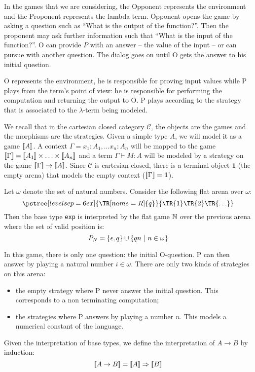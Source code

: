 In the games that we are considering, the Opponent represents the
environment and the Proponent represents the lambda term. Opponent
opens the game by asking a question such as ``What is the output of
the function?''. Then the proponent may ask further information
such that ``What is the input of the function?''. O can provide
$P$ with an answer -- the value of the input -- or can pursue with
another question. The dialog goes on until O gets the answer to his
initial question.

O represents the environment, he is responsible for proving input
values while P plays from the term's point of view: he is
responsible for performing the computation and returning the output
to O. P plays according to the strategy that is associated to the
$\lambda$-term being modeled.

We recall that in the cartesian closed category $\mathcal{C}$, the
objects are the games and the morphisms are the strategies. Given a
simple type $A$, we will model it as a game ${[\![ A ]\!]}$. A context
$\Gamma = x_1 :A_1, \ldots x_n:A_n$ will be mapped to the game
${[\![ \Gamma ]\!]} = {[\![ A_1 ]\!]} \times \ldots \times {[\![A_n ]\!]}$ and a term
$\Gamma \vdash M : A$ will be modeled by a strategy on the game
${[\![ \Gamma ]\!]} \rightarrow {[\![A ]\!]}$. Since $\mathcal{C}$ is cartesian
closed, there is a terminal object $\textbf{1}$ (the empty arena)
that models the empty context (${[\![ \Gamma ]\!]} = \textbf{1}$).


Let $\omega$ denote the set of natural numbers. Consider the
following flat arena over $\omega$:
$$  \pstree[levelsep=6ex]
    {\TR[name=R]{q}}
    { \TR{1} \TR{2} \TR{\ldots}
    }
$$
Then the base type \texttt{exp} is interpreted by the flat game
$\mathbb{N}$ over the previous arena where the set of valid position is:
$$P_N = \{ \epsilon, q \} \cup \{ qn \ | \ n \in \omega \}$$


In this game, there is only one question: the initial O-question. P
can then answer by playing a natural number $i \in \omega$. There
are only two kinds of strategies on this arena:
\begin{itemize}
\item the empty strategy where P never answer the initial question. This corresponds to a non terminating computation;
\item the strategies where P answers by playing a number $n$. This models a numerical constant of the language.
\end{itemize}

Given the interpretation of base types, we define the interpretation
of $A\rightarrow B$ by induction:
$${[\![ A \rightarrow B ]\!]} = {[\![ A ]\!]} \Rightarrow {[\![B ]\!]}$$

